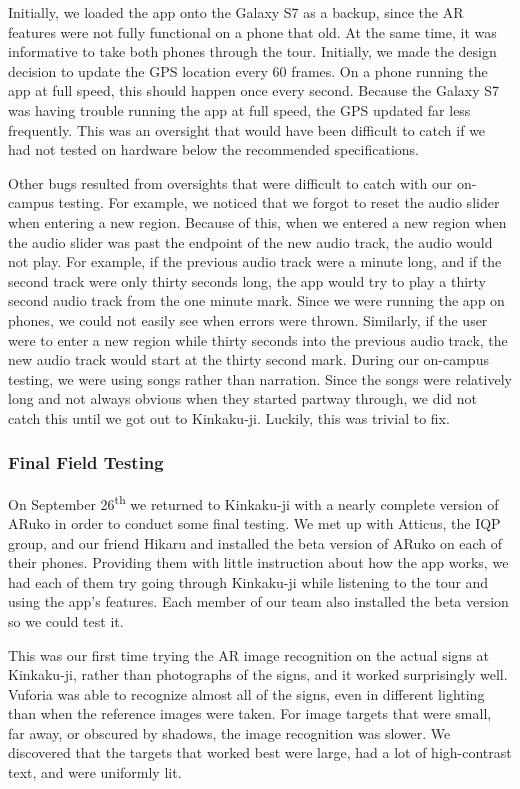 \documentclass[a4paper, 10pt, american, titlepage]{article}
\begin{document}
Initially, we loaded the app onto the Galaxy S7 as a backup, since the AR
features were not fully functional on a phone that old. At the same time, it was
informative to take both phones through the tour. Initially, we made the design
decision to update the GPS location every 60 frames. On a phone running the app
at full speed, this should happen once every second. Because the Galaxy S7 was
having trouble running the app at full speed, the GPS updated far less
frequently. This was an oversight that would have been difficult to catch if we
had not tested on hardware below the recommended specifications.

Other bugs resulted from oversights that were difficult to catch with our
on-campus testing. For example, we noticed that we forgot to reset the audio
slider when entering a new region.  Because of this, when we entered a new
region when the audio slider was past the endpoint of the new audio track, the
audio would not play. For example, if the previous audio track were a minute
long, and if the second track were only thirty seconds long, the app would try
to play a thirty second audio track from the one minute mark. Since we were
running the app on phones, we could not easily see when errors were thrown.
Similarly, if the user were to enter a new region while thirty seconds into the
previous audio track, the new audio track would start at the thirty second
mark. During our on-campus testing, we were using songs rather than narration.
Since the songs were relatively long and not always obvious when they started
partway through, we did not catch this until we got out to Kinkaku-ji. Luckily,
this was trivial to fix.

\subsubsection{Final Field Testing}
\label{sec:finalFieldTesting}

On September 26\textsuperscript{th} we returned to Kinkaku-ji with a nearly
complete version of ARuko in order to conduct some final testing. We met up with
Atticus, the IQP group, and our friend Hikaru and installed the beta version of
ARuko on each of their phones. Providing them with little instruction about how
the app works, we had each of them try going through Kinkaku-ji while listening
to the tour and using the app's features. Each member of our team also installed
the beta version so we could test it.

This was our first time trying the AR image recognition on the actual signs at
Kinkaku-ji, rather than photographs of the signs, and it worked surprisingly
well. Vuforia was able to recognize almost all of the signs, even in different
lighting than when the reference images were taken. For image targets that were
small, far away, or obscured by shadows, the image recognition was slower. We
discovered that the targets that worked best were large, had a lot of
high-contrast text, and were uniformly lit.
\end{document}
